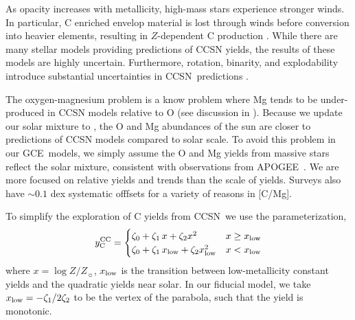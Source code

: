 \documentclass[fleqn,
usenatbib]{mnras}
\newcommand{\apogee}{APOGEE}
\newcommand{\cc}{CCSN}
\newcommand{\gce}{GCE}
\newcommand{\Ycc}{{y_{\rm C}^{\rm CC}}}
\newcommand{\zetao}{\zeta_0}
\newcommand{\zetai}{\zeta_{1}}
\newcommand{\zetaii}{\zeta_{2}}
\newcommand{\Zl}{x_{\rm low}}
\newcommand{\Zo}{ Z_{\sun}}
\newcommand{\about}[1]{${\sim} #1$}
\begin{document}
As opacity increases with metallicity, high-mass stars experience stronger winds. In particular, C enriched envelop material is lost through winds before conversion into heavier elements, resulting in $Z$-dependent C production \citep{LC18}.
While there are many stellar models providing predictions of \cc{} yields, the results of these models are highly uncertain. Furthermore, rotation, binarity, and explodability introduce substantial uncertainties in \cc\ predictions \citep{farmer+21}.

The oxygen-magnesium problem is a know problem where Mg tends to be under-produced in CCSN models relative to 
 O (see discussion in \citealt{emily+21}). Because we update our solar mixture to \citet{magg+22}, the O and Mg abundances of the sun are closer to predictions of CCSN models compared to \citet{asplund+09} solar scale. 
To avoid this problem in our \gce\ models, we simply assume the O and Mg yields from massive stars reflect the solar mixture, consistent with observations from \apogee\ \citep{weinberg+19, weinberg+22, david_fe}. We are more focused on relative yields and trends than the scale of yields. Surveys also have \about{0.1} dex systematic offfsets for a variety of reasons in [C/Mg]. 

To simplify the exploration of C yields from \cc\, we use the parameterization, 
\begin{equation}\label{eq:y_cc}
    \Ycc = \begin{cases}
    \zetao + \zetai\,x + \zetaii x^2 & x \geq \Zl
    \\
    \zetao + \zetai\,\Zl + \zetaii \Zl^2 & x < \Zl
    \end{cases}
\end{equation}
where $x=\log Z/\Zo$, $x_{\rm low}$ is the transition between low-metallicity constant yields and the quadratic yields near solar.
In our fiducial model, we take $x_{\rm low} = -\zetai / 2\zetaii$ to be the vertex of the parabola, such that the yield is monotonic. 
\end{document}
